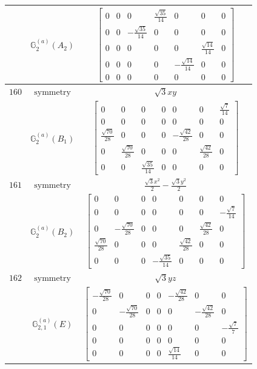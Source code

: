 \documentclass[fleqn,8pt,landscape]{jsarticle}
\begin{document}
\begin{longtable}{ccc}
$  $ & $ \mathbb{G}_{2}^{(a)}(A_{2}) $ & $ \begin{bmatrix} 0 & 0 & 0 & \frac{\sqrt{35}}{14} & 0 & 0 & 0 \\ 0 & 0 & - \frac{\sqrt{35}}{14} & 0 & 0 & 0 & 0 \\ 0 & 0 & 0 & 0 & 0 & \frac{\sqrt{14}}{14} & 0 \\ 0 & 0 & 0 & 0 & - \frac{\sqrt{14}}{14} & 0 & 0 \\ 0 & 0 & 0 & 0 & 0 & 0 & 0 \end{bmatrix} $ \\ \hline
$ 160 $ & $ \text{symmetry} $ & $ \sqrt{3} x y $ \\
$  $ & $ \mathbb{G}_{2}^{(a)}(B_{1}) $ & $ \begin{bmatrix} 0 & 0 & 0 & 0 & 0 & 0 & \frac{\sqrt{7}}{14} \\ 0 & 0 & 0 & 0 & 0 & 0 & 0 \\ \frac{\sqrt{70}}{28} & 0 & 0 & 0 & - \frac{\sqrt{42}}{28} & 0 & 0 \\ 0 & \frac{\sqrt{70}}{28} & 0 & 0 & 0 & \frac{\sqrt{42}}{28} & 0 \\ 0 & 0 & \frac{\sqrt{35}}{14} & 0 & 0 & 0 & 0 \end{bmatrix} $ \\ \hline
$ 161 $ & $ \text{symmetry} $ & $ \frac{\sqrt{3} x^{2}}{2} - \frac{\sqrt{3} y^{2}}{2} $ \\
$  $ & $ \mathbb{G}_{2}^{(a)}(B_{2}) $ & $ \begin{bmatrix} 0 & 0 & 0 & 0 & 0 & 0 & 0 \\ 0 & 0 & 0 & 0 & 0 & 0 & - \frac{\sqrt{7}}{14} \\ 0 & - \frac{\sqrt{70}}{28} & 0 & 0 & 0 & \frac{\sqrt{42}}{28} & 0 \\ \frac{\sqrt{70}}{28} & 0 & 0 & 0 & \frac{\sqrt{42}}{28} & 0 & 0 \\ 0 & 0 & 0 & - \frac{\sqrt{35}}{14} & 0 & 0 & 0 \end{bmatrix} $ \\ \hline
$ 162 $ & $ \text{symmetry} $ & $ \sqrt{3} y z $ \\
$  $ & $ \mathbb{G}_{2,1}^{(a)}(E) $ & $ \begin{bmatrix} - \frac{\sqrt{70}}{28} & 0 & 0 & 0 & - \frac{\sqrt{42}}{28} & 0 & 0 \\ 0 & - \frac{\sqrt{70}}{28} & 0 & 0 & 0 & - \frac{\sqrt{42}}{28} & 0 \\ 0 & 0 & 0 & 0 & 0 & 0 & - \frac{\sqrt{7}}{7} \\ 0 & 0 & 0 & 0 & 0 & 0 & 0 \\ 0 & 0 & 0 & 0 & \frac{\sqrt{14}}{14} & 0 & 0 \end{bmatrix} $ \\ \hline

\end{longtable}
\end{document}
